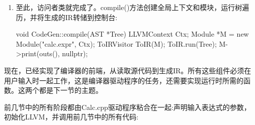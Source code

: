 \begin{enumerate}
\item
至此，访问者类就完成了。compile()方法创建全局上下文和模块，运行树遍历，并将生成的IR转储到控制台:

\begin{cpp}
void CodeGen::compile(AST *Tree) {
    LLVMContext Ctx;
    Module *M = new Module("calc.expr", Ctx);
    ToIRVisitor ToIR(M);
    ToIR.run(Tree);
    M->print(outs(), nullptr);
}
\end{cpp}

\end{enumerate}

现在，已经实现了编译器的前端，从读取源代码到生成IR。所有这些组件必须在用户输入时一起工作，这是编译器驱动程序的任务，还需要实现运行时所需的函数。这两个都是下一节的主题。


前几节中的所有阶段都由Calc.cpp驱动程序粘合在一起:声明输入表达式的参数，初始化LLVM，并调用前几节中的所有代码:

